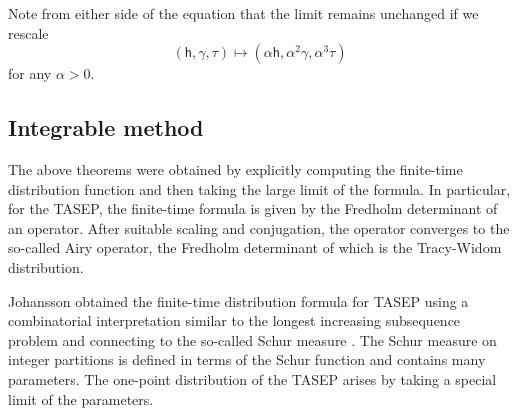 \documentclass[10pt]{article}
\theoremstyle{plain}
\theoremstyle{definition}
\newcommand{\beq}{ \begin{equation} }
\newcommand{\eeq}{ \end{equation} }
\newcommand{\kmath}{\mathsf}  %
\newcommand{\kt}{\tau} %
\newcommand{\kga}{\gamma} %
\newcommand{\kh}{\kmath{h}}  %
\numberwithin{equation}{section}
\begin{document}
Note from either side of the equation that the limit remains unchanged if we rescale 
\beq \label{eq:rescale}
	(\kh, \kga, \kt ) \mapsto (\alpha \kh, \alpha^2 \kga, \alpha^3 \kt)
\eeq 
for any $\alpha>0$. %





\subsection{Integrable method} \label{sec:integrablemethod}

The above theorems were obtained by explicitly computing the finite-time distribution function and then taking the large limit of the formula. 
In particular, for the TASEP, the finite-time formula is given by the Fredholm determinant of an operator. 
After suitable scaling and conjugation, the operator converges to the so-called Airy operator, the Fredholm determinant of which is the Tracy-Widom distribution. 


Johansson obtained the finite-time distribution formula for TASEP using a combinatorial interpretation similar to the longest increasing subsequence problem and connecting to the so-called Schur measure \cite{Okounkov01}. 
The Schur measure on integer partitions is defined in terms of the Schur function and contains many parameters. 
The one-point distribution of the TASEP arises by taking a special limit of the parameters.   
\end{document}
